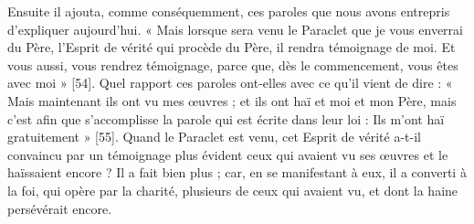 Ensuite il ajouta, comme conséquemment, ces paroles que nous avons entrepris d’expliquer aujourd’hui. « Mais lorsque sera venu le Paraclet que je vous enverrai du Père, l’Esprit de vérité qui procède du Père, il rendra témoignage de moi. Et vous aussi, vous rendrez témoignage, parce que, dès le commencement, vous êtes avec moi » [54]. Quel rapport ces paroles ont-elles avec ce qu’il vient de dire : « Mais maintenant ils ont vu mes œuvres ; et ils ont haï et moi et mon Père, mais c’est afin que s’accomplisse la parole qui est écrite dans leur loi : Ils m’ont haï gratuitement » [55]. Quand le Paraclet est venu, cet Esprit de vérité a-t-il convaincu par un témoignage plus évident ceux qui avaient vu ses œuvres et le haïssaient encore ? Il a fait bien plus ; car, en se manifestant à eux, il a converti à la foi, qui opère par la charité, plusieurs de ceux qui avaient vu, et dont la haine persévérait encore.